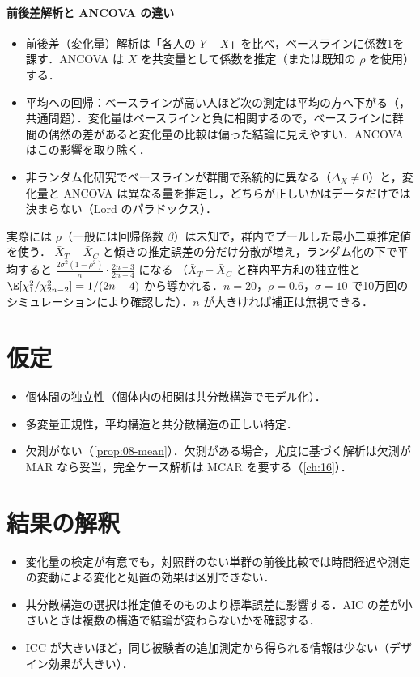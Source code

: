 \paragraph{前後差解析と ANCOVA の違い}
\begin{itemize}
\item 前後差（変化量）解析は「各人の $Y-X$」を比べ，ベースラインに係数1を課す．ANCOVA は $X$ を共変量として係数を推定（または既知の $\rho$ を使用）する．
\item 平均への回帰：ベースラインが高い人ほど次の測定は平均の方へ下がる（，共通問題）．変化量はベースラインと負に相関するので，ベースラインに群間の偶然の差があると変化量の比較は偏った結論に見えやすい．ANCOVA はこの影響を取り除く．
\item 非ランダム化研究でベースラインが群間で系統的に異なる（$\Delta_X\ne0$）と，変化量と ANCOVA は異なる量を推定し，どちらが正しいかはデータだけでは決まらない（Lord のパラドックス）．
\end{itemize}

\begin{supbox}
実際には $\rho$（一般には回帰係数 $\beta$）は未知で，群内でプールした最小二乗推定値を使う．
$\bar X_T-\bar X_C$ と傾きの推定誤差の分だけ分散が増え，ランダム化の下で平均すると $\frac{2\sigma^2(1-\rho^2)}{n}\cdot\frac{2n-3}{2n-4}$ になる
（$\bar X_T-\bar X_C$ と群内平方和の独立性と $\E[\chi^2_1/\chi^2_{2n-2}]=1/(2n-4)$ から導かれる．$n=20$，$\rho=0.6$，$\sigma=10$ で10万回のシミュレーションにより確認した）．$n$ が大きければ補正は無視できる．
\end{supbox}

\section{仮定}\label{sec:08-assump}
\begin{itemize}
\item 個体間の独立性（個体内の相関は共分散構造でモデル化）．
\item 多変量正規性，平均構造と共分散構造の正しい特定．
\item 欠測がない（\cref{prop:08-mean}）．欠測がある場合，尤度に基づく解析は欠測が MAR なら妥当，完全ケース解析は MCAR を要する（\cref{ch:16}）．
\end{itemize}

\section{結果の解釈}\label{sec:08-interp}
\begin{itemize}
\item 変化量の検定が有意でも，対照群のない単群の前後比較では時間経過や測定の変動による変化と処置の効果は区別できない．
\item 共分散構造の選択は推定値そのものより標準誤差に影響する．AIC の差が小さいときは複数の構造で結論が変わらないかを確認する．
\item ICC が大きいほど，同じ被験者の追加測定から得られる情報は少ない（デザイン効果が大きい）．
\end{itemize}


